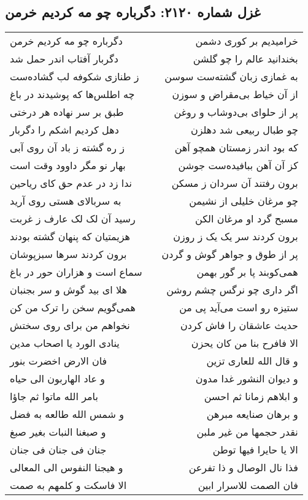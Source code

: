 \begin{center}
\section*{غزل شماره ۲۱۲۰: دگرباره چو مه کردیم خرمن}
\label{sec:2120}
\begin{longtable}{l p{0.5cm} r}
دگرباره چو مه کردیم خرمن
&&
خرامیدیم بر کوری دشمن
\\
دگربار آفتاب اندر حمل شد
&&
بخندانید عالم را چو گلشن
\\
ز طنازی شکوفه لب گشاده‌ست
&&
به غمازی زبان گشته‌ست سوسن
\\
چه اطلس‌ها که پوشیدند در باغ
&&
از آن خیاط بی‌مقراض و سوزن
\\
طبق بر سر نهاده هر درختی
&&
پر از حلوای بی‌دوشاب و روغن
\\
دهل کردیم اشکم را دگربار
&&
چو طبال ربیعی شد دهلزن
\\
ز ره گشته ز باد آن روی آبی
&&
که بود اندر زمستان همچو آهن
\\
بهار نو مگر داوود وقت است
&&
کز آن آهن ببافیده‌ست جوشن
\\
ندا زد در عدم حق کای ریاحین
&&
برون رفتند آن سردان ز مسکن
\\
به سربالای هستی روی آرید
&&
چو مرغان خلیلی از نشیمن
\\
رسید آن لک لک عارف ز غربت
&&
مسبح گرد او مرغان الکن
\\
هزیمتیان که پنهان گشته بودند
&&
برون کردند سر یک یک ز روزن
\\
برون کردند سرها سبزپوشان
&&
پر از طوق و جواهر گوش و گردن
\\
سماع است و هزاران حور در باغ
&&
همی‌کوبند پا بر گور بهمن
\\
هلا ای بید گوش و سر بجنبان
&&
اگر داری چو نرگس چشم روشن
\\
همی‌گویم سخن را ترک من کن
&&
ستیزه رو است می‌آید پی من
\\
نخواهم من برای روی سختش
&&
حدیث عاشقان را فاش کردن
\\
ینادی الورد یا اصحاب مدین
&&
الا فافرح بنا من کان یحزن
\\
فان الارض اخضرت بنور
&&
و قال الله للعاری تزین
\\
و عاد الهاربون الی حیاه
&&
و دیوان النشور غدا مدون
\\
بامر الله ماتوا ثم جاؤا
&&
و ابلاهم زمانا ثم احسن
\\
و شمس الله طالعه به فضل
&&
و برهان صنایعه مبرهن
\\
و صبغنا النبات بغیر صبغ
&&
نقدر حجمها من غیر ملبن
\\
جنان فی جنان فی جنان
&&
الا یا حایرا فیها توطن
\\
و هیجنا النفوس الی المعالی
&&
فذا نال الوصال و ذا تفرعن
\\
الا فاسکت و کلمهم به صمت
&&
فان الصمت للاسرار ابین
\\
\end{longtable}
\end{center}
